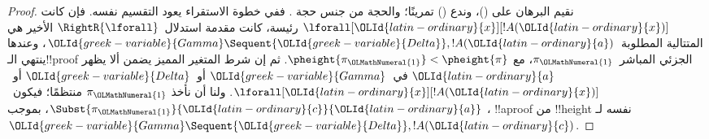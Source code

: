 \documentclass[../../../include/open-logic-section]{subfiles}
\begin{document}
\begin{proof}
نقيم البرهان على ()، وندع () تمرينًا؛ والحجة من جنس حجة
. ففي خطوة الاستقراء يعود التقسيم نفسه. فإن كانت
$\lforall[{\OLId{latin-ordinary}{x}}][!A({\OLId{latin-ordinary}{x}})]$ رئيسة، كانت مقدمة استدلال~$\RightR{\lforall}$
الأخير هي المتتالية المطلوبة~${\OLId{greek-variable}{Gamma}}\Sequent{\OLId{greek-variable}{Delta}},!A({\OLId{latin-ordinary}{a}})$، وعندها ينتهي
الـ!!{proof} الجزئي المباشر~$\pi_{\OLMathNumeral{1}}$، مع
$\pheight{\pi_{\OLMathNumeral{1}}}<\pheight{\pi}$. ثم إن شرط المتغير المميز يضمن ألا يظهر
${\OLId{latin-ordinary}{a}}$ في~${\OLId{greek-variable}{Gamma}}$ أو~${\OLId{greek-variable}{Delta}}$ أو~$\lforall[{\OLId{latin-ordinary}{x}}][!A({\OLId{latin-ordinary}{x}})]$. ولنا أن نأخذ
$\pi_{\OLMathNumeral{1}}$ منتظمًا؛ فيكون~$\Subst{\pi_{\OLMathNumeral{1}}}{{\OLId{latin-ordinary}{c}}}{{\OLId{latin-ordinary}{a}}}$، بموجب
، !!a{proof} من !!{height} نفسه
لـ${\OLId{greek-variable}{Gamma}}\Sequent{\OLId{greek-variable}{Delta}},!A({\OLId{latin-ordinary}{c}})$.


\end{proof}
\end{document}
